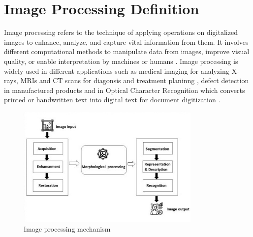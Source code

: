 \section{Image Processing Definition}
Image processing refers to the technique of applying operations on digitalized images to enhance, analyze, and capture vital information from them. It involves different computational methods to manipulate data from images, improve visual quality, or enable interpretation by machines or humans \cite{gonzales1987digital}. Image processing is widely used in different applications such as medical imaging for analyzing X-rays, MRIs and CT scans for diagonsis and treatment planinng \cite{suzuki2017overview},  defect detection in manufactured products \cite{he2016deep} and in Optical Character Recognition which converts printed or handwritten text into digital text for document digitization \cite{smith2007overview}.%

\begin{figure}[H]
    \centering
    \includegraphics[width=0.8\textwidth]{Figures/Chapter 1/image_processing.jpg}
    \caption{Image processing mechanism}
    \label{fig:Imgprocessing}
\end{figure}

